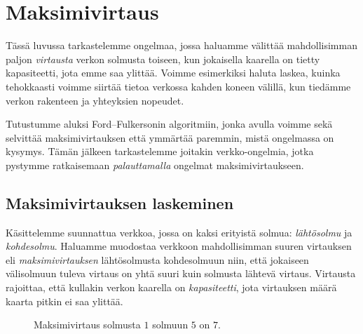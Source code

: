 \chapter{Maksimivirtaus}


Tässä luvussa tarkastelemme ongelmaa,
jossa haluamme välittää mahdollisimman paljon
\emph{virtausta} verkon solmusta toiseen,
kun jokaisella kaarella on tietty kapasiteetti,
jota emme saa ylittää.
Voimme esimerkiksi haluta laskea, kuinka tehokkaasti
voimme siirtää tietoa verkossa kahden koneen välillä,
kun tiedämme verkon rakenteen ja yhteyksien nopeudet.

Tutustumme aluksi Ford–Fulkersonin algoritmiin,
jonka avulla voimme sekä selvittää maksimivirtauksen
että ymmärtää paremmin, mistä ongelmassa on kysymys.
Tämän jälkeen tarkastelemme joitakin verkko-ongelmia,
jotka pystymme ratkaisemaan \emph{palauttamalla}
ongelmat maksimivirtaukseen.

\section{Maksimivirtauksen laskeminen}

Käsittelemme suunnattua verkkoa,
jossa on kaksi erityistä solmua:
\emph{lähtösolmu} ja \emph{kohdesolmu}.
Haluamme muodostaa verkkoon mahdollisimman
suuren virtauksen eli \emph{maksimivirtauksen}
lähtösolmusta kohdesolmuun niin, että
jokaiseen välisolmuun tuleva virtaus on
yhtä suuri kuin solmusta lähtevä virtaus.
Virtausta rajoittaa, että kullakin verkon kaarella on
\emph{kapasiteetti}, jota virtauksen
määrä kaarta pitkin ei saa ylittää.

\begin{figure}
\center
\begin{center}
\end{center}
\caption{Maksimivirtaus solmusta $1$ solmuun $5$ on $7$.}
\label{fig:makvir}
\end{figure}

